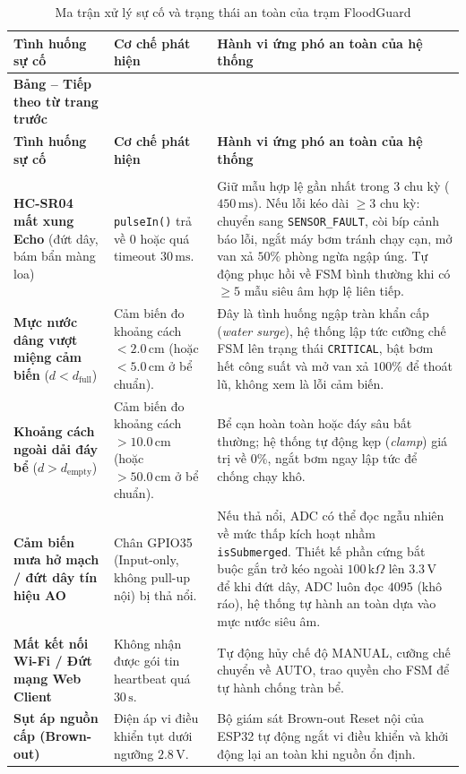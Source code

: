 \begingroup
\small
\renewcommand{\arraystretch}{1.3}
\begin{xltabular}{\textwidth}{|>{\raggedright\arraybackslash}p{3.2cm}|>{\raggedright\arraybackslash}p{3.8cm}|X|}
\caption{Ma trận xử lý sự cố và trạng thái an toàn của trạm FloodGuard} \label{tab:fault_matrix} \\
\hline
\textbf{Tình huống sự cố} & \textbf{Cơ chế phát hiện} & \textbf{Hành vi ứng phó an toàn của hệ thống} \\ \hline
\endfirsthead

%
{{\bfseries Bảng \thetable{} -- Tiếp theo từ trang trước}} \\
\hline
\textbf{Tình huống sự cố} & \textbf{Cơ chế phát hiện} & \textbf{Hành vi ứng phó an toàn của hệ thống} \\ \hline
\endhead

\hline {} \\ \hline
\endfoot

\hline
\endlastfoot

\textbf{HC-SR04 mất xung Echo} (đứt dây, bám bẩn màng loa) & \texttt{pulseIn()} trả về $0$ hoặc quá timeout $30\,\text{ms}$. & Giữ mẫu hợp lệ gần nhất trong 3 chu kỳ ($450\,\text{ms}$). Nếu lỗi kéo dài $\ge 3$ chu kỳ: chuyển sang \texttt{SENSOR\_FAULT}, còi bíp cảnh báo lỗi, ngắt máy bơm tránh chạy cạn, mở van xả $50\%$ phòng ngừa ngập úng. Tự động phục hồi về FSM bình thường khi có $\ge 5$ mẫu siêu âm hợp lệ liên tiếp. \\ \hline
\textbf{Mực nước dâng vượt miệng cảm biến} ($d < d_{\text{full}}$) & Cảm biến đo khoảng cách $< 2.0\,\text{cm}$ (hoặc $< 5.0\,\text{cm}$ ở bể chuẩn). & Đây là tình huống ngập tràn khẩn cấp (\textit{water surge}), hệ thống lập tức cưỡng chế FSM lên trạng thái \texttt{CRITICAL}, bật bơm hết công suất và mở van xả $100\%$ để thoát lũ, không xem là lỗi cảm biến. \\ \hline
\textbf{Khoảng cách ngoài dải đáy bể} ($d > d_{\text{empty}}$) & Cảm biến đo khoảng cách $> 10.0\,\text{cm}$ (hoặc $> 50.0\,\text{cm}$ ở bể chuẩn). & Bể cạn hoàn toàn hoặc đáy sâu bất thường; hệ thống tự động kẹp (\textit{clamp}) giá trị về $0\%$, ngắt bơm ngay lập tức để chống chạy khô. \\ \hline
\textbf{Cảm biến mưa hở mạch / đứt dây tín hiệu AO} & Chân GPIO35 (Input-only, không pull-up nội) bị thả nổi. & Nếu thả nổi, ADC có thể đọc ngẫu nhiên về mức thấp kích hoạt nhầm \texttt{isSubmerged}. Thiết kế phần cứng bắt buộc gắn trở kéo ngoài $100\,\text{k}\Omega$ lên $3.3\,\text{V}$ để khi đứt dây, ADC luôn đọc $4095$ (khô ráo), hệ thống tự hành an toàn dựa vào mực nước siêu âm. \\ \hline
\textbf{Mất kết nối Wi-Fi / Đứt mạng Web Client} & Không nhận được gói tin heartbeat quá $30\,\text{s}$. & Tự động hủy chế độ MANUAL, cưỡng chế chuyển về AUTO, trao quyền cho FSM để tự hành chống tràn bể. \\ \hline
\textbf{Sụt áp nguồn cấp (Brown-out)} & Điện áp vi điều khiển tụt dưới ngưỡng $2.8\,\text{V}$. & Bộ giám sát Brown-out Reset nội của ESP32 tự động ngắt vi điều khiển và khởi động lại an toàn khi nguồn ổn định. \\ \hline
\end{xltabular}
\endgroup
